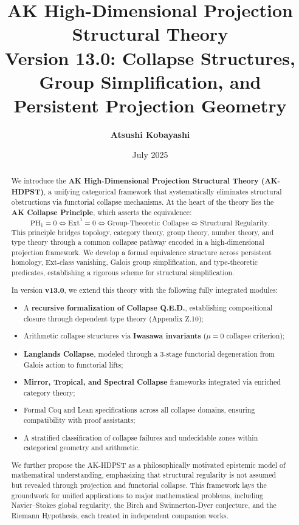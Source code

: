 \documentclass[11pt]{article}
\title{AK High-Dimensional Projection Structural Theory\\
\Large Version 13.0: Collapse Structures, Group Simplification, and Persistent Projection Geometry}
\author{\textbf{Atsushi Kobayashi} \quad {\small (with ChatGPT Research Partner)}}
\date{July 2025}
\begin{document}
\maketitle
\tableofcontents
\newpage


\begin{abstract}
We introduce the \textbf{AK High-Dimensional Projection Structural Theory (AK-HDPST)}, a unifying categorical framework that systematically eliminates structural obstructions via functorial collapse mechanisms. At the heart of the theory lies the \textbf{AK Collapse Principle}, which asserts the equivalence:
\[
\mathrm{PH}_1 = 0 \iff \mathrm{Ext}^1 = 0 \iff \text{Group-Theoretic Collapse} \iff \text{Structural Regularity}.
\]
This principle bridges topology, category theory, group theory, number theory, and type theory through a common collapse pathway encoded in a high-dimensional projection framework. We develop a formal equivalence structure across persistent homology, Ext-class vanishing, Galois group simplification, and type-theoretic predicates, establishing a rigorous scheme for structural simplification.

In version \textbf{v13.0}, we extend this theory with the following fully integrated modules:

\begin{itemize}
    \item A \textbf{recursive formalization of Collapse Q.E.D.}, establishing compositional closure through dependent type theory (Appendix Z.10);
    \item Arithmetic collapse structures via \textbf{Iwasawa invariants} (\( \mu = 0 \) collapse criterion);
    \item \textbf{Langlands Collapse}, modeled through a 3-stage functorial degeneration from Galois action to functorial lifts;
    \item \textbf{Mirror, Tropical, and Spectral Collapse} frameworks integrated via enriched category theory;
    \item Formal Coq and Lean specifications across all collapse domains, ensuring compatibility with proof assistants;
    \item A stratified classification of collapse failures and undecidable zones within categorical geometry and arithmetic.
\end{itemize}

We further propose the AK-HDPST as a philosophically motivated epistemic model of mathematical understanding, emphasizing that structural regularity is not assumed but revealed through projection and functorial collapse. This framework lays the groundwork for unified applications to major mathematical problems, including Navier–Stokes global regularity, the Birch and Swinnerton-Dyer conjecture, and the Riemann Hypothesis, each treated in independent companion works.
\end{abstract}
\end{document}
